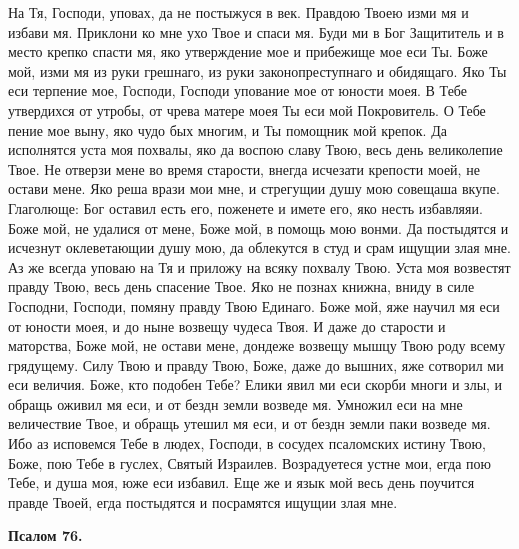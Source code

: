 На Тя, Господи, уповах, да не постыжуся в век. Правдою Твоею изми мя и избави мя. Приклони ко мне ухо Твое и спаси мя. Буди ми в Бог Защититель и в место крепко спасти мя, яко утверждение мое и прибежище мое еси Ты. Боже мой, изми мя из руки грешнаго, из руки законопреступнаго и обидящаго. Яко Ты еси терпение мое, Господи, Господи упование мое от юности моея. В Тебе утвердихся от утробы, от чрева матере моея Ты еси мой Покровитель. О Тебе пение мое выну, яко чудо бых многим, и Ты помощник мой крепок. Да исполнятся уста моя похвалы, яко да воспою славу Твою, весь день великолепие Твое. Не отверзи мене во время старости, внегда исчезати крепости моей, не остави мене. Яко реша врази мои мне, и стрегущии душу мою совещаша вкупе. Глаголюще: Бог оставил есть его, поженете и имете его, яко несть избавляяи. Боже мой, не удалися от мене, Боже мой, в помощь мою вонми. Да постыдятся и исчезнут оклеветающии душу мою, да облекутся в студ и срам ищущии злая мне. Аз же всегда уповаю на Тя и приложу на всяку похвалу Твою. Уста моя возвестят правду Твою, весь день спасение Твое. Яко не познах книжна, вниду в силе Господни, Господи, помяну правду Твою Единаго. Боже мой, яже научил мя еси от юности моея, и до ныне возвещу чудеса Твоя. И даже до старости и маторства, Боже мой, не остави мене, дондеже возвещу мышцу Твою роду всему грядущему. Силу Твою и правду Твою, Боже, даже до вышних, яже сотворил ми еси величия. Боже, кто подобен Тебе? Елики явил ми еси скорби многи и злы, и обращь оживил мя еси, и от бездн земли возведе мя. Умножил еси на мне величествие Твое, и обращь утешил мя еси, и от бездн земли паки возведе мя. Ибо аз исповемся Тебе в людех, Господи, в сосудех псаломских истину Твою, Боже, пою Тебе в гуслех, Святый Израилев. Возрадуетеся устне мои, егда пою Тебе, и душа моя, юже еси избавил. Еще же и язык мой весь день поучится правде Твоей, егда постыдятся и посрамятся ищущии злая мне.


\medskip


\bfseries Псалом 76.\normalfont{}


